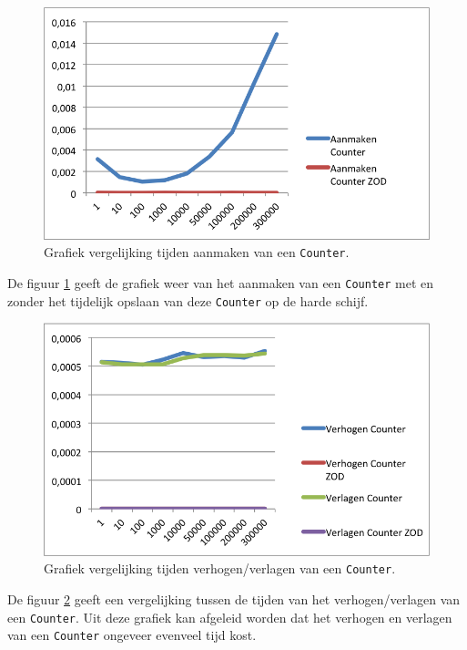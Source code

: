 \begin{figure}[h]
  \centering
  \includegraphics[scale=1.0]{Afbeeldingen/Evaluatie/AanmakenCounter}
  \caption{Grafiek vergelijking tijden aanmaken van een \texttt{Counter}.}
  \label{fig:GraphCounter}
\end{figure}

De figuur \ref{fig:GraphCounter} geeft de grafiek weer van het aanmaken van een \texttt{Counter} met en zonder het tijdelijk opslaan van deze \texttt{Counter} op de harde schijf.\\



\begin{figure}[h]
  \centering
  \includegraphics[scale=1.0]{Afbeeldingen/Evaluatie/VerhogenCounter}
  \caption{Grafiek vergelijking tijden verhogen/verlagen van een \texttt{Counter}.}
  \label{fig:GraphCounterInc}
\end{figure}

De figuur \ref{fig:GraphCounterInc} geeft een vergelijking tussen de tijden van het verhogen/verlagen van een \texttt{Counter}. Uit deze grafiek kan afgeleid worden dat het verhogen en verlagen van een \texttt{Counter} ongeveer evenveel tijd kost. \\


